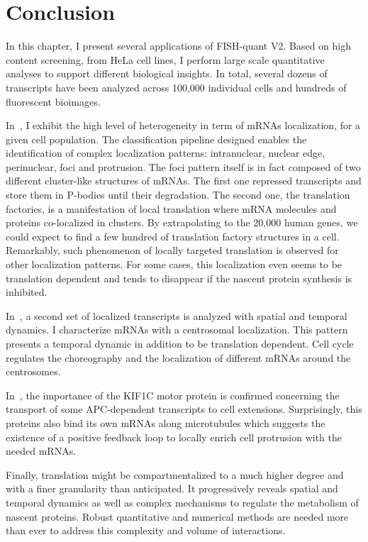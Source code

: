 \section{Conclusion}
\label{sec:conclusion_chapter5}

In this chapter, I present several applications of FISH-quant V2.
Based on high content screening, from HeLa cell lines, I perform large scale quantitative analyses to support different biological insights.
In total, several dozens of transcripts have been analyzed across 100,000 individual cells and hundreds of fluorescent bioimages.

In~\cite{CHOUAIB_2020}, I exhibit the high level of heterogeneity in term of \ac{mRNA}s localization, for a given cell population.
The classification pipeline designed enables the identification of complex localization patterns: intranuclear, nuclear edge, perinuclear, foci and protrusion.
The foci pattern itself is in fact composed of two different cluster-like structures of \ac{mRNA}s.
The first one repressed transcripts and store them in \ac{P-bodies} until their degradation.
The second one, the translation factories, is a manifestation of local translation where \ac{mRNA} molecules and proteins co-localized in clusters.
By extrapolating to the 20,000 human genes, we could expect to find a few hundred of translation factory structures in a cell.
Remarkably, such phenomenon of locally targeted translation is observed for other localization patterns.
For some cases, this localization even seems to be translation dependent and tends to disappear if the nascent protein synthesis is inhibited.

In~\cite{safieddine_choreography_2021}, a second set of localized transcripts is analyzed with spatial and temporal dynamics.
I characterize \ac{mRNA}s with a centrosomal localization.
This pattern presents a temporal dynamic in addition to be translation dependent.
Cell cycle regulates the choreography and the localization of different \ac{mRNA}s around the centrosomes.

In~\cite{pichon_kinesin_2021}, the importance of the KIF1C motor protein is confirmed concerning the transport of some APC-dependent transcripts to cell extensions.
Surprisingly, this proteins also bind its own \ac{mRNA}s along microtubules which suggests the existence of a positive feedback loop to locally enrich cell protrusion with the needed \ac{mRNA}s.

Finally, translation might be compartmentalized to a much higher degree and with a finer granularity than anticipated.
It progressively reveals spatial and temporal dynamics as well as complex mechanisms to regulate the metabolism of nascent proteins.
Robust quantitative and numerical methods are needed more than ever to address this complexity and volume of interactions.